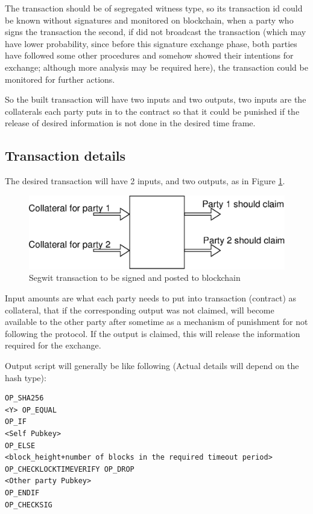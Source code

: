 \documentclass[]{article}
\begin{document}
The transaction should be of segregated witness \cite{segwit} type, so its transaction id could be known without signatures and monitored on blockchain, when a party who signs the transaction the second, if did not broadcast the transaction (which may have lower probability, since before this signature exchange phase, both parties have followed some other procedures and somehow showed their intentions for exchange; although more analysis may be required here), the transaction could be monitored for further actions.

So the built transaction will have two inputs and two outputs, two inputs are the collaterals each party puts in to the contract so that it could be punished if the release of desired information is not done in the desired time frame.

\subsection{Transaction details}

The desired transaction will have 2 inputs, and two outputs, as in Figure \ref{fig:transaction}.

\begin{figure}[h!]
	\centering
	\includegraphics[width=1\textwidth]{images/transaction.eps}
	\caption{Segwit transaction	to be signed and posted to blockchain}
	\label{fig:transaction}
\end{figure}

Input amounts are what each party needs to put into transaction (contract) as collateral, that if the corresponding output was not claimed, will become available to the other party after sometime as a mechanism of punishment for not following the protocol. If the output is claimed, this will release the information required for the exchange.

Output script will generally be like following (Actual details will depend on the hash type):

\begin{verbatim}
OP_SHA256
<Y> OP_EQUAL
OP_IF
<Self Pubkey>
OP_ELSE
<block_height+number of blocks in the required timeout period> OP_CHECKLOCKTIMEVERIFY OP_DROP
<Other party Pubkey>
OP_ENDIF
OP_CHECKSIG
\end{verbatim}
\end{document}
